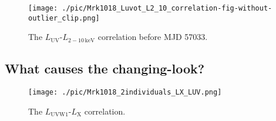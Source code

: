 \begin{figure}
\centering
	\texttt{[image: ./pic/Mrk1018\_Luvot\_L2\_10\_correlation-fig-without-outlier\_clip.png]}
    \caption{The $L_{\mathrm{UV}}$-$L_{\mathrm{2-10\,keV}}$ correlation before MJD 57033.}   
    \label{fig:luv_lx}
\end{figure}



\subsection{What causes the changing-look?}
\label{sec:Changing-look}


\begin{figure}
\centering
	\texttt{[image: ./pic/Mrk1018\_2individuals\_LX\_LUV.png]}
    \caption{The $L_{\mathrm{UVW1}}$-$L_{\mathrm{X}}$ correlation.}   
    \label{fig:luv_lx}
\end{figure}


